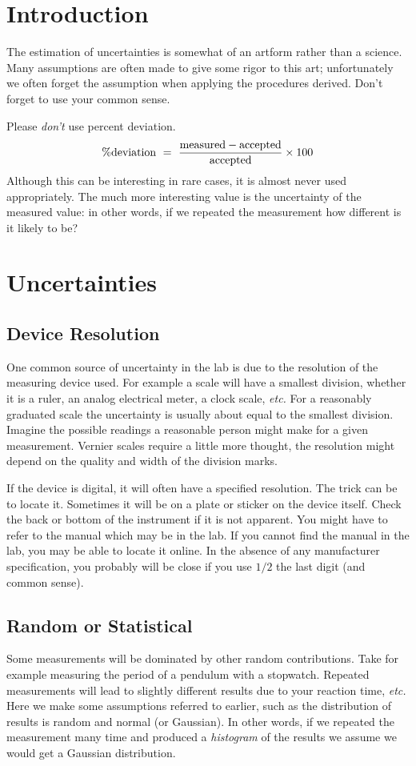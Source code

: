 \section{Introduction}
The estimation of uncertainties is somewhat of an artform rather than a science.  Many assumptions are often made to give some rigor to this art; unfortunately we often forget the assumption when applying the procedures derived.  Don't forget to use your common sense.

Please {\em don't} use percent deviation.  
\begin{equation}
\% {\rm deviation} ~=~ {{ \rm measured} - {\rm accepted } \over {\rm accepted }} \times 100
\end{equation}
Although this can be interesting in rare cases, it is almost never used appropriately.  The much more interesting value is the uncertainty of the measured value: in other words, if we repeated the measurement how different is it likely to be? 

\section{Uncertainties}

\subsection{Device Resolution}
One common source of uncertainty in the lab is due to the resolution of the measuring device used.  For example a scale will have a smallest division, whether it is a ruler, an analog electrical meter, a clock scale, {\em etc.}  For a reasonably graduated scale the uncertainty is usually about equal to the smallest division.  Imagine the possible readings a reasonable person might make for a given measurement.  Vernier scales require a little more thought, the resolution might depend on the quality and width of the division marks.

If the device is digital, it will often have a specified resolution.  The trick can be to locate it.  Sometimes it will be on a plate or sticker on the device itself.  Check the back or bottom of the instrument if it is not apparent.  You might have to refer to the manual which may be in the lab.  If you cannot find the manual in the lab, you may be able to locate it online.  In the absence of any manufacturer specification, you probably will be close if you use $1/2$ the last digit (and common sense).

\subsection{Random or Statistical}
Some measurements will be dominated by other random contributions.  Take for example measuring the period of a pendulum with a stopwatch.  Repeated measurements will lead to slightly different results due to your reaction time, {\em etc.}  Here we make some assumptions referred to earlier, such as the distribution of results is random and normal (or Gaussian).  In other words, if we repeated the measurement many time and produced a {\em histogram} of the results we assume we would get a Gaussian distribution.

